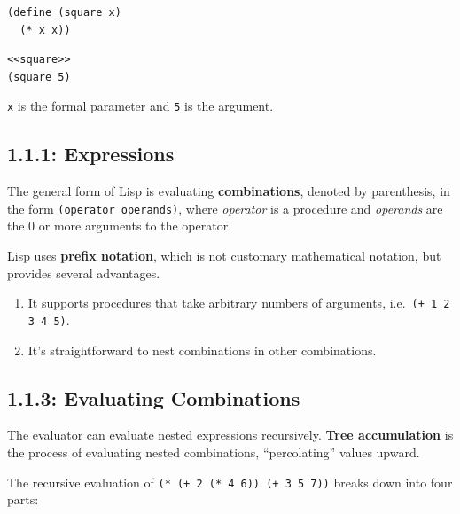 \documentclass[final,fleqn,titlepage,twoside]{article}
\begin{document}
\begin{verbatim}
(define (square x)
  (* x x))
\end{verbatim}

\begin{verbatim}
<<square>>
(square 5)
\end{verbatim}

\texttt{x} is the formal parameter and  \texttt{5} is the argument.

\subsection{1.1.1: Expressions}
\label{sec:org3c67918}
The general form of Lisp is evaluating \textbf{combinations}, denoted by parenthesis,
in the form \texttt{(operator operands)}, where \emph{operator} is a procedure and
\emph{operands} are the 0 or more arguments to the operator.

Lisp uses \textbf{prefix notation}, which is not customary mathematical notation, but
provides several advantages.
\begin{enumerate}
\item It supports procedures that take arbitrary numbers of arguments,
i.e. \texttt{(+ 1 2 3 4 5)}.
\item It's straightforward to nest combinations in other combinations.
\end{enumerate}

\subsection{1.1.3: Evaluating Combinations}
\label{sec:orgec0aba4}
The evaluator can evaluate nested expressions recursively. \textbf{Tree accumulation}
is the process of evaluating nested combinations, ``percolating'' values upward.

The recursive evaluation of \texttt{(* (+ 2 (* 4 6)) (+ 3 5 7))} breaks down
into four parts:
\end{document}

